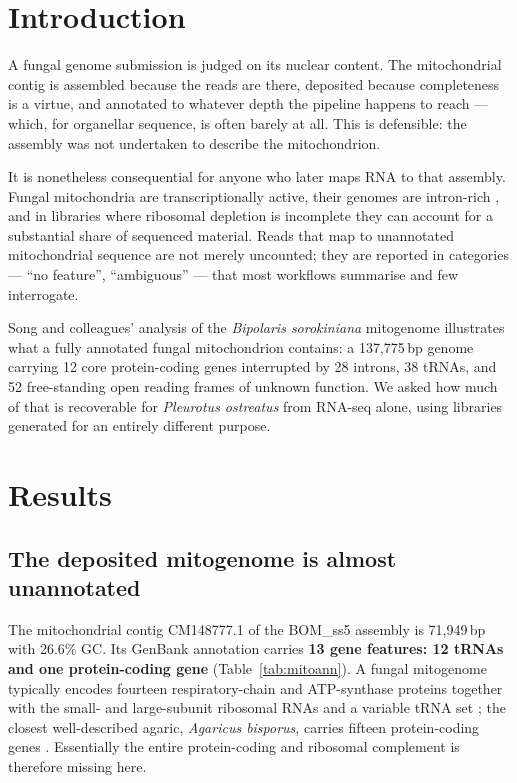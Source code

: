 \section{Introduction}

A fungal genome submission is judged on its nuclear content. The mitochondrial contig is
assembled because the reads are there, deposited because completeness is a virtue, and
annotated to whatever depth the pipeline happens to reach --- which, for organellar sequence, is
often barely at all. This is defensible: the assembly was not undertaken to describe the
mitochondrion.

It is nonetheless consequential for anyone who later maps RNA to that assembly. Fungal
mitochondria are transcriptionally active, their genomes are intron-rich
\cite{song2020bipolaris}, and in libraries where ribosomal depletion is incomplete they can
account for a substantial share of sequenced material. Reads that map to unannotated
mitochondrial sequence are not merely uncounted; they are reported in categories --- ``no
feature'', ``ambiguous'' --- that most workflows summarise and few interrogate.

Song and colleagues' analysis of the \textit{Bipolaris sorokiniana} mitogenome
\cite{song2020bipolaris} illustrates what a fully annotated fungal mitochondrion contains: a
137,775\,bp genome carrying 12 core protein-coding genes interrupted by 28 introns, 38 tRNAs,
and 52 free-standing open reading frames of unknown function. We asked how much of that is
recoverable for \textit{Pleurotus ostreatus} from RNA-seq alone, using libraries generated for
an entirely different purpose.

\section{Results}

\subsection{The deposited mitogenome is almost unannotated}

The mitochondrial contig CM148777.1 of the BOM\_ss5 assembly is 71,949\,bp with 26.6\% GC. Its
GenBank annotation carries \textbf{13 gene features: 12 tRNAs and one protein-coding gene}
(Table~\ref{tab:mitoann}). A fungal mitogenome typically encodes fourteen
respiratory-chain and ATP-synthase proteins together with the small- and large-subunit
ribosomal RNAs and a variable tRNA set \cite{sandor2018fungalmito}; the closest well-described
agaric, \textit{Agaricus bisporus}, carries fifteen protein-coding genes
\cite{ferandon2013agaricus}. Essentially the entire protein-coding and ribosomal complement is
therefore missing here.

